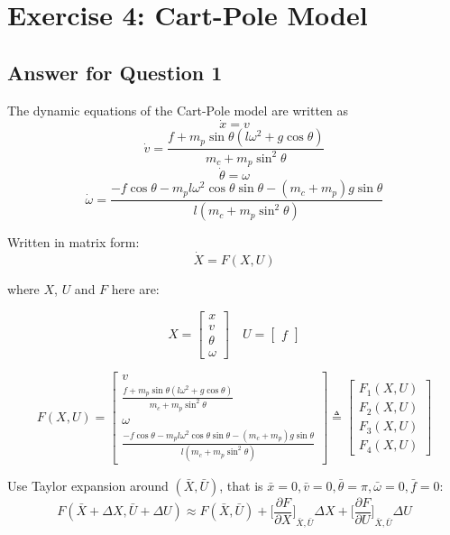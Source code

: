 \section*{Exercise 4: Cart-Pole Model}

\subsection*{Answer for Question 1}
The dynamic equations of the Cart-Pole model are written as
\[
    \dot{x} = v
\]
\[
    \dot{v} = \frac{f + m_p \sin\theta (l \omega^2 + g \cos \theta)}{m_c + m_p \sin^2 \theta}
\]
\[
    \dot{\theta} = \omega
\]
\[
    \dot{\omega} = \frac{-f\cos\theta -m_p l \omega^2 \cos\theta\sin\theta - (m_c + m_p)g \sin\theta}{l(m_c + m_p \sin^2 \theta)}
\]

Written in matrix form:
\[
    \dot{X} = F(X, U)
\]

where \(X\), \(U\) and \(F\) here are:

\[
    X =
    \begin{bmatrix}
        x \\
        v \\
        \theta \\
        \omega
    \end{bmatrix}
    \quad
    U =
    \begin{bmatrix}
        f
    \end{bmatrix}
\]

\[
    F(X, U) =
    \begin{bmatrix}
        v \\[0.8em]
        \frac{f + m_p \sin\theta (l \omega^2 + g \cos \theta)}{m_c + m_p \sin^2 \theta} \\[0.6em]
        \omega \\[0.8em]
        \frac{-f\cos\theta -m_p l \omega^2 \cos\theta\sin\theta - (m_c + m_p)g \sin\theta}{l(m_c + m_p \sin^2 \theta)}
    \end{bmatrix}
    \triangleq
    \begin{bmatrix}
        F_1(X, U) \\
        F_2(X, U) \\
        F_3(X, U) \\
        F_4(X, U)
    \end{bmatrix}
\]

Use Taylor expansion around \( (\bar{X}, \bar{U}) \), that is \( \bar{x}=0, \bar{v}=0, \bar{\theta}=\pi, \bar{\omega}=0, \bar{f}=0 \):
\[
    F(\bar{X} + \Delta X, \bar{U} + \Delta U)
    \approx F(\bar{X}, \bar{U}) + {\Big[ \frac{\partial F}{\partial X} \Big]}_{\bar{X}, \bar{U}} \Delta X + {\Big[ \frac{\partial F}{\partial U} \Big]}_{\bar{X}, \bar{U}} \Delta U
\]

